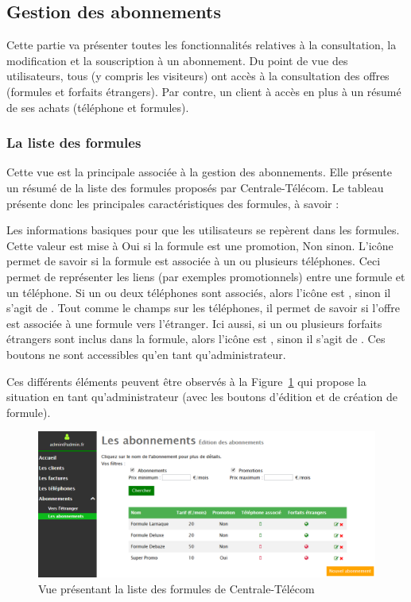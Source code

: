 \subsection{Gestion des abonnements}
Cette partie va présenter toutes les fonctionnalités relatives à la consultation, la modification et la souscription à un abonnement. Du point de vue des utilisateurs, tous (y compris les visiteurs) ont accès à la consultation des offres (formules et forfaits étrangers). Par contre, un client à accès en plus à un résumé de ses achats (téléphone et formules).

\subsubsection{La liste des formules}
Cette vue est la principale associée à la gestion des abonnements. Elle présente un résumé de la liste des formules proposés par Centrale-Télécom. Le tableau présente donc les principales caractéristiques des formules, à savoir :
\begin{itemize}
  Les informations basiques pour que les utilisateurs se repèrent dans les formules.
  Cette valeur est mise à \og Oui\fg{} si la formule est une promotion, \og Non\fg{} sinon.
  L'icône permet de savoir si la formule est associée à un ou plusieurs téléphones. Ceci permet de représenter les liens (par exemples promotionnels) entre une formule et un téléphone. Si un ou deux téléphones sont associés, alors l'icône est \vColor{\faMobilePhone}, sinon il s'agit de \thColor{\faMobilePhone}.
  Tout comme le champs sur les téléphones, il permet de savoir si l'offre est associée à une formule vers l'étranger. Ici aussi, si un ou plusieurs forfaits étrangers sont inclus dans la formule, alors l'icône est \vColor{\faGlobe}, sinon il s'agit de \thColor{\faGlobe}.
  Ces boutons ne sont accessibles qu'en tant qu'administrateur.
\end{itemize}
Ces différents éléments peuvent être observés à la Figure~\ref{fig:liste-formule} qui propose la situation en tant qu'administrateur (avec les boutons d'édition et de création de formule).

\begin{figure}[ht]
  \centering
  \includegraphics[width=.7\textwidth]{images/Plateforme/liste_formule}
  \caption{Vue présentant la liste des formules de Centrale-Télécom}
  \label{fig:liste-formule}
\end{figure}

